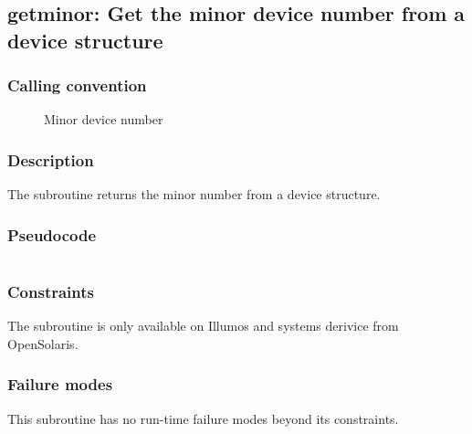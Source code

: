 \clearpage
{}
{}
\label{subr:getminor}
\subsection*{getminor: Get the minor device number from a device structure}

\subsubsection*{Calling convention}

\begin{description}
\item[] Minor device number
\end{description}

\subsubsection*{Description}

The  subroutine returns the minor number from a
device structure.
\subsubsection*{Pseudocode}

\begin{verbatim}
\end{verbatim}

\subsubsection*{Constraints}

The  subroutine is only available on Illumos and
systems derivice from OpenSolaris.

\subsubsection*{Failure modes}

This subroutine has no run-time failure modes beyond its constraints.
